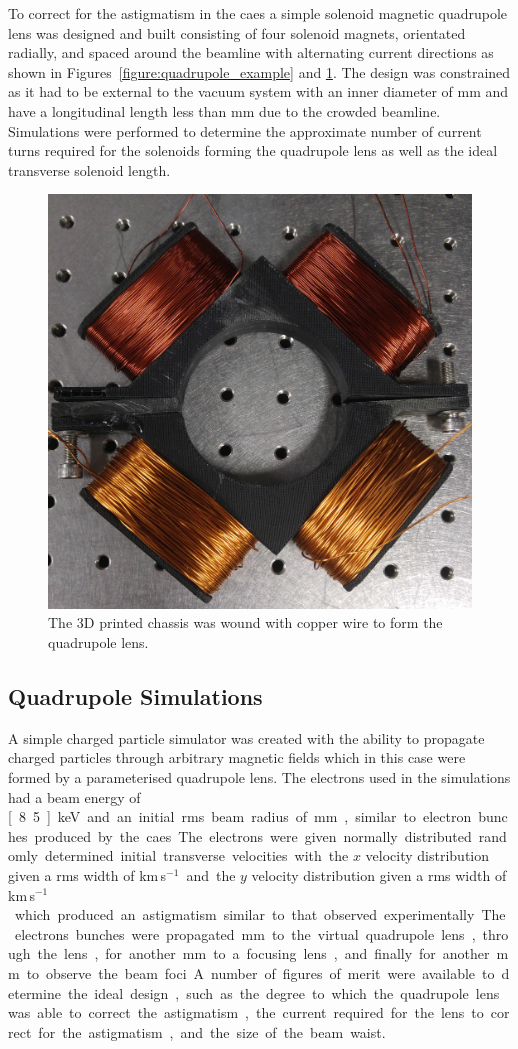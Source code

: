 To correct for the astigmatism in the \gls{caes} a simple solenoid magnetic quadrupole lens was designed and built consisting of four solenoid magnets, orientated radially, and spaced around the beamline with alternating current directions as shown in Figures~\ref{figure:quadrupole_example} and \ref{figure:quadrupole}.
The design was constrained as it had to be external to the vacuum system with an inner diameter of \unit[70]{mm} and have a longitudinal length less than \unit[20]{mm} due to the crowded beamline.
Simulations were performed to determine the approximate number of current turns required for the solenoids forming the quadrupole lens as well as the ideal transverse solenoid length.

\begin{figure}
    \centering
    \includegraphics[width=0.5\linewidth]{part2/Figs/quadrupole.jpg}
    \caption[3D printed quadrupole lens.]{The 3D printed chassis was wound with copper wire to form the quadrupole lens.}
    \label{figure:quadrupole}
\end{figure}

\subsection{Quadrupole Simulations}

A simple charged particle simulator was created with the ability to propagate charged particles through arbitrary magnetic fields which in this case were formed by a parameterised quadrupole lens.
The electrons used in the simulations had a beam energy of \unit[8.5]{keV} and an initial \gls{rms} beam radius of \unit[5]{mm}, similar to electron bunches produced by the \gls{caes}.
The electrons were given normally distributed randomly determined initial transverse velocities with the $x$ velocity distribution given a \gls{rms} width of \unit[10]{km\,s$^{-1}$} and the $y$ velocity distribution given a \gls{rms} width of \unit[20]{km\,s$^{-1}$} which produced an astigmatism similar to that observed experimentally.
The electrons bunches were propagated \unit[250]{mm} to the virtual quadrupole lens, through the lens, for another \unit[250]{mm} to a focusing lens, and finally for another \unit[500]{mm} to observe the beam foci.
A number of figures of merit were available to determine the ideal design, such as the degree to which the quadrupole lens was able to correct the astigmatism, the current required for the lens to correct for the astigmatism, and the size of the beam waist.

